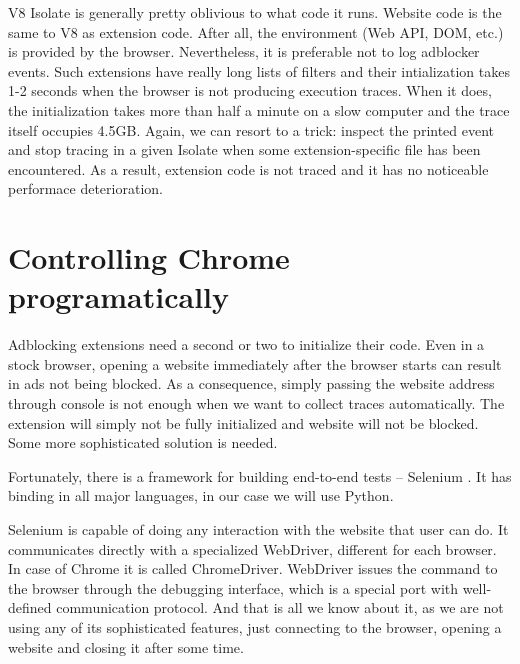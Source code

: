 V8 Isolate is generally pretty oblivious to what code it runs. Website code is the same to V8 
as extension code. After all, the environment (Web API, DOM, etc.) is provided by the browser.
Nevertheless, it is preferable not to log adblocker events. Such extensions have really long lists of filters
and their intialization takes 1-2 seconds when the browser is not producing execution traces.
When it does, the initialization takes more than half a minute on a slow computer and the trace itself 
occupies 4.5GB. Again, we can resort to a trick: inspect the printed event and stop tracing in a given 
Isolate when some extension-specific file has been encountered. As a result, extension code is not
traced and it has no noticeable performace deterioration.


\section{Controlling Chrome programatically}

Adblocking extensions need a second or two to initialize their code. Even in a stock browser,
opening a website immediately after the browser starts can result in ads not being blocked.
As a consequence, simply passing the website address through console is not enough 
when we want to collect traces automatically. The extension will simply not be fully initialized
and website will not be blocked. Some more sophisticated solution is needed.

Fortunately, there is a framework for building end-to-end tests -- Selenium \cite{selenium-python}. 
It has binding in all major languages, in our case we will use Python.

Selenium is capable of doing any interaction with the website that user can do.
It communicates directly with a specialized WebDriver, different for each browser.
In case of Chrome it is called ChromeDriver. WebDriver issues the command to the browser through
the debugging interface, which is a special port with well-defined communication protocol.
And that is all we know about it, as we are not using any of its sophisticated features, 
just connecting to the browser, opening a website and closing it after some time.
